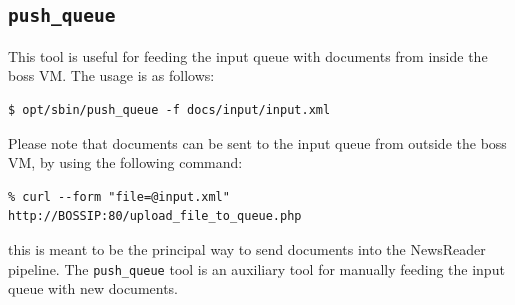 \documentclass[a4]{article}
\newcommand{\todo}[1]{\textcolor{red}{\noindent$\rightarrow$ TODO: #1}}
\begin{document}
\subsection*{\texttt{push\_queue}}
\label{sec:send-to-queue.pl}

This tool is useful for feeding the input queue with documents from inside
the \textrm{boss} VM. The usage is as follows:

\begin{verbatim}
$ opt/sbin/push_queue -f docs/input/input.xml
\end{verbatim}

Please note that documents can be sent to the input queue from outside the
\textrm{boss} VM, by using the following command:

\begin{verbatim}
% curl --form "file=@input.xml" http://BOSSIP:80/upload_file_to_queue.php
\end{verbatim}


\noindent this is meant to be the principal way to send documents into the
NewsReader pipeline. The \texttt{push\_queue} tool is an auxiliary tool
for manually feeding the input queue with new documents.

%




\end{document}

